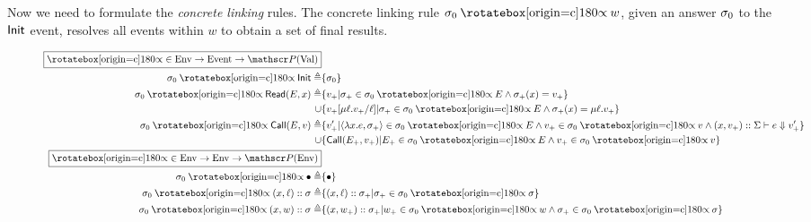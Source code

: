 Now we need to formulate the \emph{concrete linking} rules.
The concrete linking rule $\ctx_0\semlink w$, given an answer $\sigma_0$ to the $\textsf{Init}$ event, resolves all events within $w$ to obtain a set of final results.

\begin{figure}
  \begin{align*}
    \fbox{$\semlink\in\Ctx\rightarrow\Event\rightarrow\pset(\Value)$}                                                                                                                               \\
    \ctx_0\semlink\InitE\triangleq                         & \{\ctx_0\}                                                                                                                             \\
    \ctx_0\semlink\ReadE(\event,x)\triangleq               & \{v_+|\ctx_+\in\ctx_0\semlink\event\land\ctx_+(x)=v_+\}                                                                                \\
    \cup                                                   & \{v_+[\mu\ell.v_+/\ell]|\ctx_+\in\ctx_0\semlink E\land\ctx_+(x)=\mu\ell.v_+\}                                                          \\
    \ctx_0\semlink\CallE(\event,v)\triangleq               & \{v_+'|\langle\lambda x.e,\ctx_+\rangle\in\ctx_0\semlink E\land v_+\in\ctx_0\semlink v\land(x,v_+)\cons\Sigma\vdash e\Downarrow v_+'\} \\
    \cup                                                   & \{\CallE(\event_+,v_+)|\event_+\in\ctx_0\semlink\event\land v_+\in\ctx_0\semlink v\}                                                   \\
    \fbox{$\semlink\in\Ctx\rightarrow\Ctx\rightarrow\pset(\Ctx)$}                                                                                                                                   \\
    \ctx_0\semlink\bullet\triangleq                        & \{\bullet\}                                                                                                                            \\
    \ctx_0\semlink(x,\ell)\cons\ctx\triangleq              & \{(x,\ell)\cons\ctx_+|\ctx_+\in\ctx_0\semlink\ctx\}                                                                                    \\
    \ctx_0\semlink(x,w)\cons\ctx\triangleq                 & \{(x,w_+)\cons\ctx_+|w_+\in\ctx_0\semlink w\land\ctx_+\in\ctx_0\semlink\ctx\}                                                          \\

\end{align*}
\end{figure}
